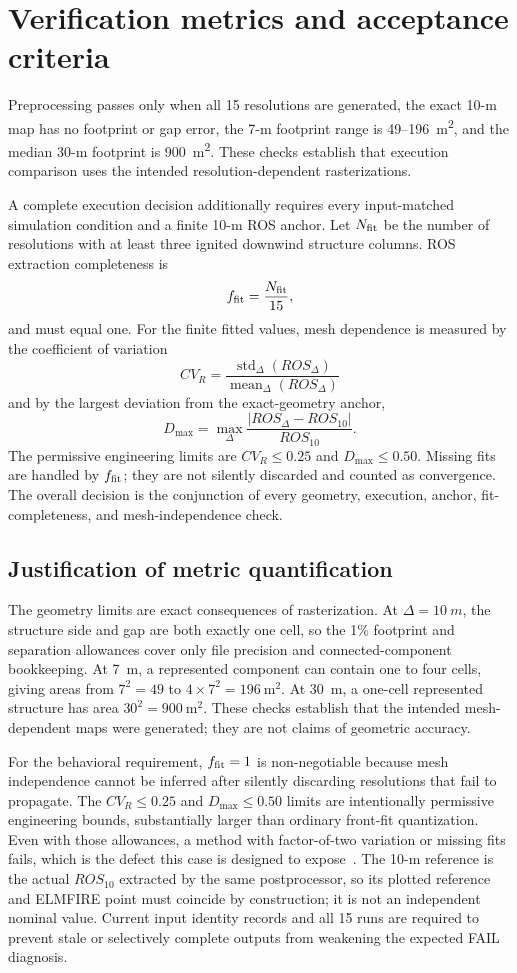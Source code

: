 \section{Verification metrics and acceptance criteria}

Preprocessing passes only when all 15 resolutions are generated, the exact
10-m map has no footprint or gap error, the 7-m footprint range is
49--\SI{196}{m^2}, and the median 30-m footprint is \SI{900}{m^2}.
These checks establish that execution comparison uses the intended
resolution-dependent rasterizations.

A complete execution decision additionally requires every input-matched
simulation condition and a finite 10-m ROS anchor. Let \(N_{\rm fit}\) be the number of
resolutions with at least three ignited downwind structure columns. ROS
extraction completeness is
\[
 f_{\rm fit}=\frac{N_{\rm fit}}{15},
\]
and must equal one. For the finite fitted values, mesh dependence is measured
by the coefficient of variation
\[
 CV_R=\frac{\operatorname{std}_{\Delta}(ROS_\Delta)}
            {\operatorname{mean}_{\Delta}(ROS_\Delta)}
\]
and by the largest deviation from the exact-geometry anchor,
\[
 D_{\max}=\max_\Delta\frac{|ROS_\Delta-ROS_{10}|}{ROS_{10}}.
\]
The permissive engineering limits are \(CV_R\le0.25\) and
\(D_{\max}\le0.50\). Missing fits are handled by \(f_{\rm fit}\); they are not
silently discarded and counted as convergence. The overall decision is the
conjunction of every geometry, execution, anchor, fit-completeness, and
mesh-independence check.

\subsection{Justification of metric quantification}

The geometry limits are exact consequences of rasterization.  At
\(\Delta=\SI{10}{m}\), the structure side and gap are both exactly one cell,
so the 1\% footprint and separation allowances cover only file precision and
connected-component bookkeeping.  At \SI{7}{m}, a represented component can
contain one to four cells, giving areas from \(7^2=49\) to
\(4\times7^2=196\ \mathrm{m^2}\).  At \SI{30}{m}, a one-cell represented
structure has area \(30^2=900\ \mathrm{m^2}\).  These checks establish that
the intended mesh-dependent maps were generated; they are not claims of
geometric accuracy.

For the behavioral requirement, \(f_{\rm fit}=1\) is non-negotiable because
mesh independence cannot be inferred after silently discarding resolutions
that fail to propagate.  The \(CV_R\le0.25\) and \(D_{\max}\le0.50\)
limits are intentionally permissive engineering bounds, substantially larger
than ordinary front-fit quantization.  Even with those allowances, a method
with factor-of-two variation or missing fits fails, which is the defect this
case is designed to expose~\cite{QinEtAl2026}.  The 10-m reference is the
actual \(ROS_{10}\) extracted by the same postprocessor, so its plotted
reference and ELMFIRE point must coincide by construction; it is not an
independent nominal value.  Current input identity records and all 15 runs are required
to prevent stale or selectively complete outputs from weakening the expected
FAIL diagnosis.

